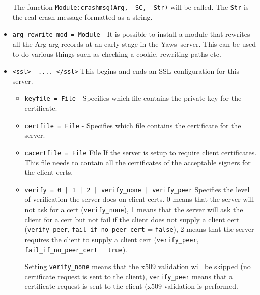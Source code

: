 \documentclass[11pt,oneside,english]{book}
\newcommand{\Yaws}            %
        {{\sc Yaws}}
\begin{document}
\begin{itemize}
              The function \verb+Module:crashmsg(Arg,  SC,  Str)+
              will  be  called.  The \verb+Str+ is the real crash
              message formatted as a string.

\item       \verb+arg_rewrite_mod = Module+ -
              It is possible  to  install  a  module  that
              rewrites  all  the  Arg arg{} records at an
              early stage in the \Yaws\  server.  This can be
              used to do various things such as checking a
              cookie, rewriting paths etc.

\item        \verb+<ssl>  .... </ssl>+
              This begins and ends  an  SSL  configuration
              for this server.
\begin{itemize}
\item        \verb+keyfile = File+ -
              Specifies  which  file  contains the private
              key for the certificate.

\item        \verb+certfile = File+ -
              Specifies which file contains  the  certificate for the server.

\item        \verb+cacertfile = File+
              File  If  the  server  is  setup  to require
              client certificates. This file needs to contain
              all the certificates of the acceptable
              signers for the client certs.

\item        \verb+verify = 0 | 1 | 2 | verify_none | verify_peer+
              Specifies the level of verification the server does
              on client certs. 0 means that the server will not
              ask for a cert (\verb+verify_none+), 1 means that
              the server will ask the client for a cert but not
              fail if the client does not supply a client cert
              (\verb+verify_peer+, \verb+fail_if_no_peer_cert+
              = \verb+false+), 2 means that the server requires
              the client to supply a client cert
              (\verb+verify_peer+, \verb+fail_if_no_peer_cert+ =
              \verb+true+).

              Setting \verb+verify_none+ means that the x509
              validation will be skipped (no certificate request
              is sent to the client), \verb+verify_peer+ means
              that a certificate request is sent to the client
              (x509 validation is performed.


\end{itemize}
\end{itemize}
\end{document}
